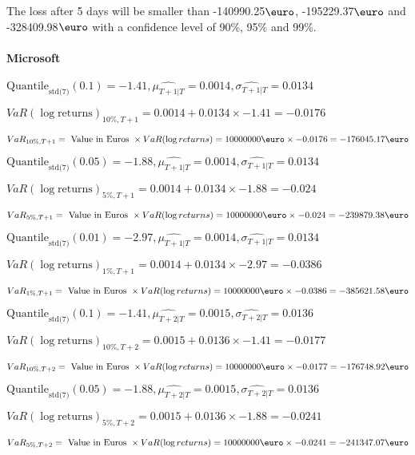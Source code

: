 The loss after 5 days will be smaller than -140990.25$\text{\euro}$, -195229.37$\text{\euro}$  and -328409.98$\text{\euro}$  with a confidence level of 90\%, 95\%  and 99\%.


\paragraph{Microsoft}


$\text{Quantile}_\text{std(7)}(0.1) = -1.41,\hat{\mu_{T+1|T}} = 0.0014, \hat{\sigma_{T+1|T}} = 0.0134$

$VaR(\log \text{returns})_{10\%, T + 1} = 0.0014 + 0.0134\times-1.41 = -0.0176$

$VaR_{10\%, T + 1} = \text{ Value in Euros } \times VaR(\log returns) = 10 000 000 \text{\euro} \times-0.0176 = -176045.17 \text{\euro}$


$\text{Quantile}_\text{std(7)}(0.05) = -1.88,\hat{\mu_{T+1|T}} = 0.0014, \hat{\sigma_{T+1|T}} = 0.0134$

$VaR(\log \text{returns})_{5\%, T + 1} = 0.0014 + 0.0134\times-1.88 = -0.024$

$VaR_{5\%, T + 1} = \text{ Value in Euros } \times VaR(\log returns) = 10 000 000 \text{\euro} \times-0.024 = -239879.38 \text{\euro}$


$\text{Quantile}_\text{std(7)}(0.01) = -2.97,\hat{\mu_{T+1|T}} = 0.0014, \hat{\sigma_{T+1|T}} = 0.0134$

$VaR(\log \text{returns})_{1\%, T + 1} = 0.0014 + 0.0134\times-2.97 = -0.0386$

$VaR_{1\%, T + 1} = \text{ Value in Euros } \times VaR(\log returns) = 10 000 000 \text{\euro} \times-0.0386 = -385621.58 \text{\euro}$


$\text{Quantile}_\text{std(7)}(0.1) = -1.41,\hat{\mu_{T+2|T}} = 0.0015, \hat{\sigma_{T+2|T}} = 0.0136$

$VaR(\log \text{returns})_{10\%, T + 2} = 0.0015 + 0.0136\times-1.41 = -0.0177$

$VaR_{10\%, T + 2} = \text{ Value in Euros } \times VaR(\log returns) = 10 000 000 \text{\euro} \times-0.0177 = -176748.92 \text{\euro}$


$\text{Quantile}_\text{std(7)}(0.05) = -1.88,\hat{\mu_{T+2|T}} = 0.0015, \hat{\sigma_{T+2|T}} = 0.0136$

$VaR(\log \text{returns})_{5\%, T + 2} = 0.0015 + 0.0136\times-1.88 = -0.0241$

$VaR_{5\%, T + 2} = \text{ Value in Euros } \times VaR(\log returns) = 10 000 000 \text{\euro} \times-0.0241 = -241347.07 \text{\euro}$


